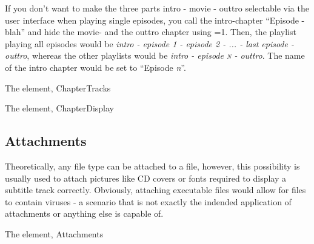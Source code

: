 \documentclass[12pt]{article}
\begin{document}
If you don't want to make the three parts intro - movie - outtro selectable via the user interface when playing single episodes, you call the intro-chapter ``Episode - blah'' and hide the movie- and the outtro chapter using =1. Then, the playlist playing all episodes would be \textit{intro - episode 1 - episode 2 - ... - last episode - outtro}, whereas the other playlists would be \textit{intro - episode \textsc{n} - outtro}. The name of the intro chapter would be set to ``Episode \textit{n}''.

\begin{elementdescription}{The  element, }{ChapterTracks}
\end{elementdescription}

\begin{elementdescription}{The  element, }{ChapterDisplay}
\end{elementdescription}

\newpage
\subsection{Attachments}

Theoretically, any file type can be attached to a \Matroska file, however, this possibility is usually used to attach pictures like CD covers or fonts required to display a subtitle track correctly. Obviously, attaching executable files would allow for \Matroska files to contain viruses - a scenario that is not exactly the indended application of attachments or anything else \Matroska is capable of.

\begin{elementdescription}{The  element, }{Attachments}
\end{elementdescription}
\end{document}
